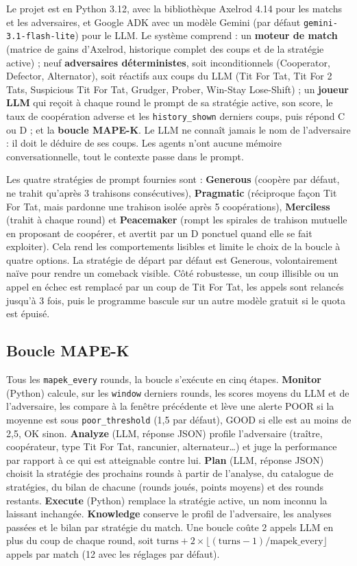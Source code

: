 \documentclass[10pt,a4paper]{article}
\begin{document}
Le projet est en Python 3.12, avec la bibliothèque Axelrod 4.14 pour les matchs
et les adversaires, et Google ADK avec un modèle Gemini (par défaut
\texttt{gemini-3.1-flash-lite}) pour le LLM. Le système comprend : un
\textbf{moteur de match} (matrice de gains d'Axelrod, historique complet des coups
et de la stratégie active) ; neuf \textbf{adversaires déterministes}, soit
inconditionnels (Cooperator, Defector, Alternator), soit réactifs aux coups du
LLM (Tit For Tat, Tit For 2 Tats, Suspicious Tit For Tat, Grudger, Prober,
Win-Stay Lose-Shift) ; un \textbf{joueur LLM} qui reçoit à chaque round le prompt
de sa stratégie active, son score, le taux de coopération adverse et les
\texttt{history\_shown} derniers coups, puis répond C ou D ; et la \textbf{boucle
  MAPE-K}. Le LLM ne connaît jamais le nom de l'adversaire : il doit le déduire de
ses coups. Les agents n'ont aucune mémoire conversationnelle, tout le contexte
passe dans le prompt.

Les quatre stratégies de prompt fournies sont : \textbf{Generous} (coopère par
défaut, ne trahit qu'après 3 trahisons consécutives), \textbf{Pragmatic}
(réciproque façon Tit For Tat, mais pardonne une trahison isolée après 5
coopérations), \textbf{Merciless} (trahit à chaque round) et \textbf{Peacemaker}
(rompt les spirales de trahison mutuelle en proposant de coopérer, et avertit par
un D ponctuel quand elle se fait exploiter). Cela rend les comportements lisibles
et limite le choix de la boucle à quatre options. La stratégie de départ par
défaut est Generous, volontairement naïve pour rendre un comeback visible. Côté
robustesse, un coup illisible ou un appel en échec est remplacé par un coup de
Tit For Tat, les appels sont relancés jusqu'à 3 fois, puis le programme bascule
sur un autre modèle gratuit si le quota est épuisé.

\subsection{Boucle MAPE-K}

Tous les \texttt{mapek\_every} rounds, la boucle s'exécute en cinq étapes.
\textbf{Monitor} (Python) calcule, sur les \texttt{window} derniers rounds, les
scores moyens du LLM et de l'adversaire, les compare à la fenêtre précédente et
lève une alerte POOR si la moyenne est sous \texttt{poor\_threshold} (1,5 par
défaut), GOOD si elle est au moins de 2,5, OK sinon. \textbf{Analyze} (LLM, réponse
JSON) profile l'adversaire (traître, coopérateur, type Tit For Tat, rancunier,
alternateur\dots) et juge la performance par rapport à ce qui est atteignable
contre lui. \textbf{Plan} (LLM, réponse JSON) choisit la stratégie des prochains
rounds à partir de l'analyse, du catalogue de stratégies, du bilan de chacune
(rounds joués, points moyens) et des rounds restants. \textbf{Execute} (Python)
remplace la stratégie active, un nom inconnu la laissant inchangée.
\textbf{Knowledge} conserve le profil de l'adversaire, les analyses passées et le
bilan par stratégie du match. Une boucle coûte 2 appels LLM en plus du coup de
chaque round, soit $\text{turns} + 2\times\lfloor(\text{turns}-1)/\text{mapek\_every}\rfloor$
appels par match (12 avec les réglages par défaut).
\end{document}
